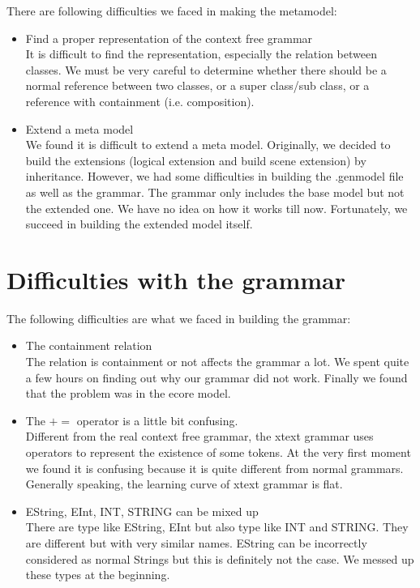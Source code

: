 \documentclass[a4paper, 11pt]{article}
\begin{document}
There are following difficulties we faced in making the metamodel: 
\begin{itemize}
\item Find a proper representation of the context free grammar \\
It is difficult to find the representation, especially the relation between classes. We must be very careful to determine whether there should be a normal reference between two classes, or a super class/sub class, or a reference with containment (i.e. composition). \bigbreak

\item Extend a meta model \\
We found it is difficult to extend a meta model. Originally, we decided to build the extensions (logical extension and build scene extension) by inheritance. However, we had some difficulties in building the .genmodel file as well as the grammar. The grammar only includes the base model but not the extended one. We have no idea on how it works till now. Fortunately, we succeed in building the extended model itself. 
\end{itemize}

\section{Difficulties with the grammar}

The following difficulties are what we faced in building the grammar: 
\begin{itemize}
\item The containment relation \\
The relation is containment or not affects the grammar a lot. We spent quite a few hours on finding out why our grammar did not work. Finally we found that the problem was in the ecore model. 

\item The $ += $ operator is a little bit confusing. \\
Different from the real context free grammar, the xtext grammar uses operators to represent the existence of some tokens. At the very first moment we found it is confusing because it is quite different from normal grammars. Generally speaking, the learning curve of xtext grammar is flat. 

\item EString, EInt, INT, STRING can be mixed up \\
There are type like EString, EInt but also type like INT and STRING. They are different but with very similar names. EString can be incorrectly considered as normal Strings but this is definitely not the case. We messed up these types at the beginning. 
\end{itemize}
\end{document}
